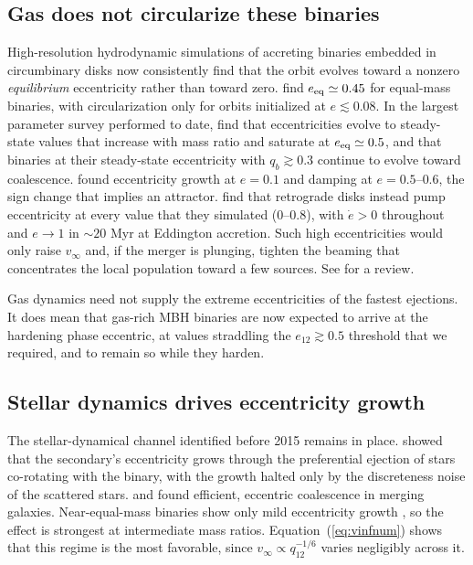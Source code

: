 \documentclass[twocolumn]{aastex701}
\newcommand{\vinf}{v_{\infty}}
\begin{document}
\subsection{Gas does not circularize these binaries}

High-resolution hydrodynamic simulations of accreting binaries embedded in
circumbinary disks now consistently find that the orbit evolves toward a nonzero
\emph{equilibrium} eccentricity rather than toward zero.
\citet{zrake21} find $e_{\rm eq}\simeq0.45$ for equal-mass binaries, with
circularization only for orbits initialized at $e\lesssim0.08$.
In the largest parameter survey performed to date, \mbox{\citet{siwek23}} find that
eccentricities evolve to steady-state values that increase with mass ratio and
saturate at $e_{\rm eq}\simeq0.5$, and that
binaries at their steady-state eccentricity with $q_{b}\gtrsim0.3$ continue to
evolve toward coalescence. \citet{munoz19} found eccentricity growth at
$e=0.1$ and damping at $e=0.5$--$0.6$, the sign change that implies an
attractor. \citet{tiede24} find that retrograde disks instead pump
eccentricity at every value that they simulated ($0$--$0.8$), with $\dot{e}>0$
throughout and $e\rightarrow1$ in $\sim20$ Myr at Eddington accretion. Such
high eccentricities would only raise $\vinf$ and, if the merger is plunging,
tighten the beaming that concentrates the local population toward a few
sources. See \citet{lai23} for a review.

Gas dynamics need not supply the extreme eccentricities of the fastest
ejections. It does mean that gas-rich MBH binaries are now expected to arrive
at the hardening phase eccentric, at values straddling the $e_{12}\gtrsim0.5$
threshold that we required, and to remain so while they harden.

\subsection{Stellar dynamics drives eccentricity growth}

The stellar-dynamical channel identified before 2015 remains in place.
\citet{iwasawa11} showed that the secondary's eccentricity grows through the
preferential ejection of stars co-rotating with the binary, with the growth
halted only by the discreteness noise of the scattered stars. \citet{baumgardt06}
and \citet{khan12} found efficient, eccentric coalescence in merging galaxies.
Near-equal-mass binaries show only mild eccentricity growth
\citep{sesana10}, so the effect is strongest at intermediate mass ratios.
Equation~(\ref{eq:vinfnum}) shows that this regime is the most
favorable, since $\vinf\propto q_{12}^{-1/6}$ varies negligibly across it.
\end{document}
